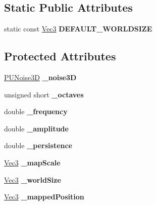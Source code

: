 \subsection*{Static Public Attributes}
\begin{DoxyCompactItemize}
\item 
\mbox{\label{classPUForceFieldCalculationFactory_ac9f6f408690d21807fc57b1cf9a36e95}} 
static const \hyperlink{classVec3}{Vec3} {\bfseries D\+E\+F\+A\+U\+L\+T\+\_\+\+W\+O\+R\+L\+D\+S\+I\+ZE}
\end{DoxyCompactItemize}
\subsection*{Protected Attributes}
\begin{DoxyCompactItemize}
\item 
\mbox{\label{classPUForceFieldCalculationFactory_a1896ca89f7240ce7cf42c2695b54ee03}} 
\hyperlink{classPUNoise3D}{P\+U\+Noise3D} {\bfseries \+\_\+noise3D}
\item 
\mbox{\label{classPUForceFieldCalculationFactory_a699b71558419d739dc2fa19da8107bcd}} 
unsigned short {\bfseries \+\_\+octaves}
\item 
\mbox{\label{classPUForceFieldCalculationFactory_a756e690d81c0af045c7229cf54d9c72b}} 
double {\bfseries \+\_\+frequency}
\item 
\mbox{\label{classPUForceFieldCalculationFactory_aa2faefb6415464367c9fc6cecca1b788}} 
double {\bfseries \+\_\+amplitude}
\item 
\mbox{\label{classPUForceFieldCalculationFactory_a12acf18f4e8bd04be641c42a2adf6504}} 
double {\bfseries \+\_\+persistence}
\item 
\mbox{\label{classPUForceFieldCalculationFactory_acc10f4079d6dca085f8ae4e3dbf16e8b}} 
\hyperlink{classVec3}{Vec3} {\bfseries \+\_\+map\+Scale}
\item 
\mbox{\label{classPUForceFieldCalculationFactory_a163d1c286761cd1177afa83e50260788}} 
\hyperlink{classVec3}{Vec3} {\bfseries \+\_\+world\+Size}
\item 
\mbox{\label{classPUForceFieldCalculationFactory_a0ff92b6e65ef1b95a9c20bd01c66e505}} 
\hyperlink{classVec3}{Vec3} {\bfseries \+\_\+mapped\+Position}
\end{DoxyCompactItemize}



